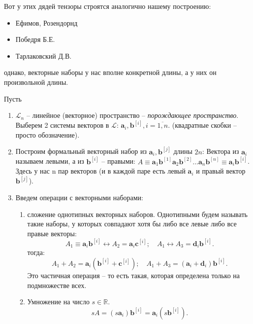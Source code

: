 Вот у этих дядей тензоры строятся аналогично нашему построению:
\begin{itemize}
  \item Ефимов, Розендорнд
  \item Победря Б.Е.
  \item Тарлаковский Д.В.
\end{itemize}
однако, векторные наборы у нас вполне конкретной длины, а у них он произвольной длины.

\begin{definition}[геометрическое]
Пусть
  \begin{enumerate}
    \item $\mathcal{L}_n$ -- линейное (векторное) пространство -- \emph{порождающее пространство}.
      Выберем 2 системы векторов в $\mathcal{L}$: $\mathbf{a}_i, \mathbf{b}^{[i]}, i = \overline{1, n}$.
      (квадратные скобки -- просто обозначение).

    \item Построим формальный векторный набор из $\mathbf{a}_i, \mathbf{b}^{[j]}$ длины $2n$:
      Вектора из $\mathbf{a}_i$ называем левыми, а из $\mathbf{b}^{[i]}$ -- правыми: 
      $A \equiv \mathbf{a}_1 \mathbf{b}^{[1]} \mathbf{a}_2 \mathbf{b}^{[2]} \dots \mathbf{a}_n \mathbf{b}^{[n]}
      \equiv \mathbf{a}_i \mathbf{b}^{[i]}$.
      Здесь у нас n пар векторов (и в каждой паре есть левый $\mathbf{a}_i$ и правый вектор
      $\mathbf{b}^{[j]}$).

    \item Введем операции с векторными наборами:
      \begin{enumerate}
        \item сложение однотипных векторных наборов. Однотипными будем называть такие наборы, у 
          которых совпадают хотя бы либо все левые либо все правые векторы:
          \[
            A_1 \equiv \mathbf{a}_i \mathbf{b}^{[i]} \leftrightarrow A_2 = \mathbf{a}_i \mathbf{c}^{[i]}; 
            \quad
            A_1 \leftrightarrow A_3 = \mathbf{d}_i \mathbf{b}^{[i]}.
          \]
          тогда:
          \[
            A_1+A_2 = \mathbf{a}_i (\mathbf{b}^{[i]} + \mathbf{c}^{[i]}); \quad
            A_1+A_3 = (\mathbf{a}_i + \mathbf{d}_i) \mathbf{b}^{[i]}.
          \]
          Это частичная операция -- то есть такая, которая определена только на подмножестве всех.

        \item Умножение на число $s \in \mathbb{R}$.
          \[
            sA = (s \mathbf{a}_i) \mathbf{b}^{[i]} = \mathbf{a}_i (s \mathbf{b}^{[i]}).
          \]
        

\end{enumerate}
\end{enumerate}
\end{definition}
